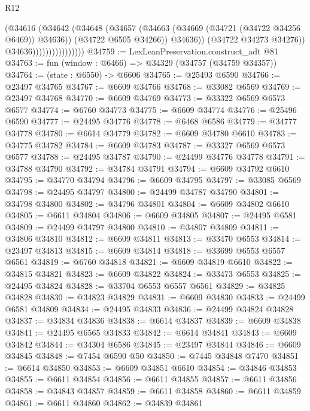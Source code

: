 \begin{lexlean}{R12}
\begin{coremodule}
                                    (@34616
                                      (@34642
                                        (@34648
                                          (@34657
                                            (@34663 (@34669 (@34721 (@34722 @34256 @6469)) @34636))
                                            (@34722 @6505 @34266))
                                          @34636))
                                      (@34722 @34273 @34276))
                                    @34636))))))))))))))))
@34759 := LexLeanPreservation.construct_adt @81
@34763 := fun (window : @6466) => @34329 (@34757 (@34759 @34357))
@34764 := (state : @6550) -> @6606
@34765 := @25493 @6590
@34766 := @23497 @34765
@34767 := @6609 @34766
@34768 := @33082 @6569
@34769 := @23497 @34768
@34770 := @6609 @34769
@34773 := @33322 @6569 @6573 @6577
@34774 := @6760 @34773
@34775 := @6609 @34774
@34776 := @25496 @6590
@34777 := @24495 @34776
@34778 := @6468 @6586
@34779 := @34777 @34778
@34780 := @6614 @34779
@34782 := @6609 @34780 @6610
@34783 := @34775 @34782
@34784 := @6609 @34783
@34787 := @33327 @6569 @6573 @6577
@34788 := @24495 @34787
@34790 := @24499 @34776 @34778
@34791 := @34788 @34790
@34792 := @34784 @34791
@34794 := @6609 @34792 @6610
@34795 := @34770 @34794
@34796 := @6609 @34795
@34797 := @33085 @6569
@34798 := @24495 @34797
@34800 := @24499 @34787 @34790
@34801 := @34798 @34800
@34802 := @34796 @34801
@34804 := @6609 @34802 @6610
@34805 := @6611 @34804
@34806 := @6609 @34805
@34807 := @24495 @6581
@34809 := @24499 @34797 @34800
@34810 := @34807 @34809
@34811 := @34806 @34810
@34812 := @6609 @34811
@34813 := @33470 @6553
@34814 := @23497 @34813
@34815 := @6609 @34814
@34818 := @33699 @6553 @6557 @6561
@34819 := @6760 @34818
@34821 := @6609 @34819 @6610
@34822 := @34815 @34821
@34823 := @6609 @34822
@34824 := @33473 @6553
@34825 := @24495 @34824
@34828 := @33704 @6553 @6557 @6561
@34829 := @34825 @34828
@34830 := @34823 @34829
@34831 := @6609 @34830
@34833 := @24499 @6581 @34809
@34834 := @24495 @34833
@34836 := @24499 @34824 @34828
@34837 := @34834 @34836
@34838 := @6614 @34837
@34839 := @6609 @34838
@34841 := @24495 @6565 @34833
@34842 := @6614 @34841
@34843 := @6609 @34842
@34844 := @34304 @6586
@34845 := @23497 @34844
@34846 := @6609 @34845
@34848 := @7454 @6590 @50
@34850 := @7445 @34848 @7470
@34851 := @6614 @34850
@34853 := @6609 @34851 @6610
@34854 := @34846 @34853
@34855 := @6611 @34854
@34856 := @6611 @34855
@34857 := @6611 @34856
@34858 := @34843 @34857
@34859 := @6611 @34858
@34860 := @6611 @34859
@34861 := @6611 @34860
@34862 := @34839 @34861

\end{coremodule}
\end{lexlean}

